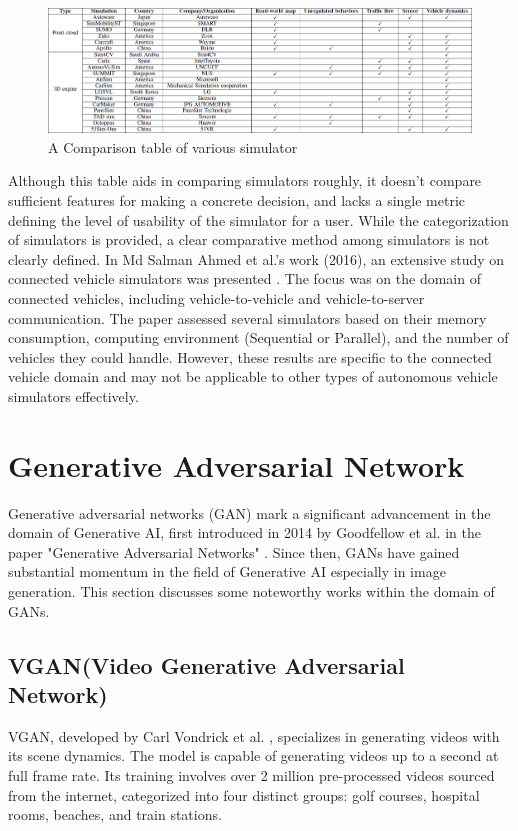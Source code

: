 \documentclass[12pt,twoside,a4paper,parskip]{scrbook} %
\begin{document}
\begin{figure}[H]
    \centering
    \includegraphics[width=1.0\textwidth]{Images/Comparision Table.png}
    \caption{A Comparison table of various simulator}
    \label{fig:comparison table}
  \end{figure}
Although this table aids in comparing simulators roughly, it doesn’t compare sufficient features for making a concrete decision, and lacks a single metric defining the level of usability of the simulator for a user. While the categorization of simulators is provided, a clear comparative method among simulators is not clearly defined.
In Md Salman Ahmed et al.'s work (2016), an extensive study on connected vehicle simulators was presented \cite{Ahmedsurvey}. The focus was on the domain of connected vehicles, including vehicle-to-vehicle and vehicle-to-server communication. The paper assessed several simulators based on their memory consumption, computing environment (Sequential or Parallel), and the number of vehicles they could handle. However, these results are specific to the connected vehicle domain and may not be applicable to other types of autonomous vehicle simulators effectively.
\section{Generative Adversarial Network}
Generative adversarial networks (GAN) mark a significant advancement in the domain of Generative AI, first introduced in 2014 by Goodfellow et al. in the paper "Generative Adversarial Networks" \cite{7_gan}. Since then, GANs have gained substantial momentum in the field of Generative AI especially in image generation. This section discusses some noteworthy works within the domain of GANs.
\subsection{VGAN(Video Generative Adversarial Network)}
VGAN, developed by Carl Vondrick et al. \cite{8_Vgan}, specializes in generating videos with its scene dynamics. The model is capable of generating videos up to a second at full frame rate. Its training involves over 2 million pre-processed videos sourced from the internet, categorized into four distinct groups: golf courses, hospital rooms, beaches, and train stations.
\end{document}
